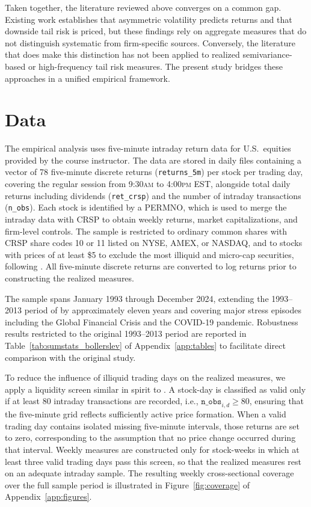 \documentclass[11pt,a4paper]{article}
\begin{document}
Taken together, the literature reviewed above converges on a common gap. Existing work establishes that asymmetric volatility predicts returns and that downside tail risk is priced, but these findings rely on aggregate measures that do not distinguish systematic from firm-specific sources. Conversely, the literature that does make this distinction has not been applied to realized semivariance-based or high-frequency tail risk measures. The present study bridges these approaches in a unified empirical framework.

\section{Data}

The empirical analysis uses five-minute intraday return data for U.S.\ equities provided
by the course instructor. The data are stored in daily files containing a vector of 78
five-minute discrete returns (\texttt{returns\_5m}) per stock per trading day, covering
the regular session from 9:30\textsc{am} to 4:00\textsc{pm} EST, alongside total daily
returns including dividends (\texttt{ret\_crsp}) and the number of intraday transactions
(\texttt{n\_obs}). Each stock is identified by a PERMNO, which is used to merge the
intraday data with CRSP to obtain weekly returns, market capitalizations, and firm-level
controls. The sample is restricted to ordinary common shares with CRSP share codes 10 or
11 listed on NYSE, AMEX, or NASDAQ, and to stocks with prices of at least \$5 to exclude
the most illiquid and micro-cap securities, following \citet{bollerslev2020}. All
five-minute discrete returns are converted to log returns prior to constructing the
realized measures.

The sample spans January 1993 through December 2024, extending the 1993--2013 period of
\citet{bollerslev2020} by approximately eleven years and covering major stress episodes
including the Global Financial Crisis and the COVID-19 pandemic. Robustness results
restricted to the original 1993--2013 period are reported in
Table~\ref{tab:sumstats_bollerslev} of Appendix~\ref{app:tables} to facilitate direct
comparison with the original study.

To reduce the influence of illiquid trading days on the realized measures, we apply a
liquidity screen similar in spirit to \citet{amaya2015}. A stock-day is classified as
valid only if at least 80 intraday transactions are recorded, i.e.,
$\texttt{n\_obs}_{i,d} \geq 80$, ensuring that the five-minute grid reflects
sufficiently active price formation. When a valid trading day contains isolated missing
five-minute intervals, those returns are set to zero, corresponding to the assumption that
no price change occurred during that interval. Weekly measures are constructed only for
stock-weeks in which at least three valid trading days pass this screen, so that the
realized measures rest on an adequate intraday sample. The resulting weekly cross-sectional
coverage over the full sample period is illustrated in Figure~\ref{fig:coverage} of
Appendix~\ref{app:figures}.
\end{document}
